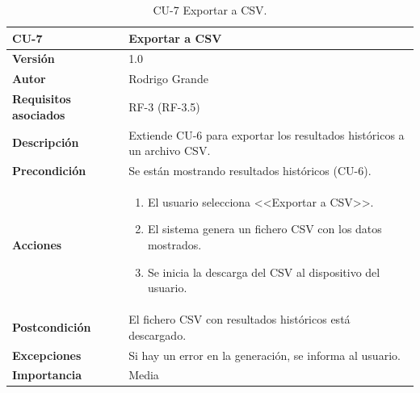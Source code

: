 \begin{table}[p]
	\centering
	\begin{tabularx}{\linewidth}{ p{} p{} }
		\toprule
		\textbf{CU-7} & \textbf{Exportar a CSV}\\
		\toprule
		\textbf{Versión}              & 1.0    \\
		\textbf{Autor}                & Rodrigo Grande \\
		\textbf{Requisitos asociados} & RF-3 (RF-3.5) \\
		\textbf{Descripción}          & Extiende CU-6 para exportar los resultados históricos a un archivo CSV.\\
		\textbf{Precondición}         & Se están mostrando resultados históricos (CU-6). \\
		\textbf{Acciones}             &
		\begin{enumerate}
			\def\labelenumi{\arabic{enumi}.}
			\tightlist
			\item El usuario selecciona <<Exportar a CSV>>.
			\item El sistema genera un fichero CSV con los datos mostrados.
			\item Se inicia la descarga del CSV al dispositivo del usuario.
		\end{enumerate}\\
		\textbf{Postcondición}        & El fichero CSV con resultados históricos está descargado. \\
		\textbf{Excepciones}          & Si hay un error en la generación, se informa al usuario. \\
		\textbf{Importancia}          & Media \\
		\bottomrule
	\end{tabularx}
	\caption{CU-7 Exportar a CSV.}
	\label{cu:exportar-csv}
\end{table}

